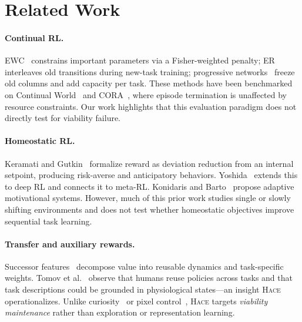 \documentclass[sigplan,10pt]{acmart}
\newcommand{\hace}{\textsc{Hace}}
\begin{document}
\section{Related Work}
\label{sec:related}

\paragraph{Continual RL.}
EWC~\cite{kirkpatrick2017} constrains important parameters via a
Fisher-weighted penalty; ER~\cite{rolnick2019} interleaves old
transitions during new-task training; progressive
networks~\cite{rusu2016} freeze old columns and add capacity per task.
These methods have been benchmarked on Continual
World~\cite{continualworld2021} and CORA~\cite{cora2022}, where episode
termination is unaffected by resource constraints.  Our work highlights
that this evaluation paradigm does not directly test for viability failure.

\paragraph{Homeostatic RL.}
Keramati and Gutkin~\cite{keramati2014} formalize reward as deviation
reduction from an internal setpoint, producing risk-averse and
anticipatory behaviors.  Yoshida~\cite{yoshida2018,Yoshida} extends this
to deep RL and connects it to meta-RL.  Konidaris and
Barto~\cite{konidaris2006} propose adaptive motivational systems.
However, much of this prior work studies single or slowly shifting environments
and does not test whether homeostatic objectives improve sequential task
learning.

\paragraph{Transfer and auxiliary rewards.}
Successor features~\cite{Barreto} decompose value into reusable dynamics
and task-specific weights.  Tomov et al.~\cite{Tomov} observe that
humans reuse policies across tasks and that task descriptions could be
grounded in physiological states---an insight \hace{} operationalizes.
Unlike curiosity~\cite{pathak2017} or pixel control~\cite{jaderberg2017},
\hace{} targets \emph{viability maintenance} rather than exploration or
representation learning.


\end{document}
